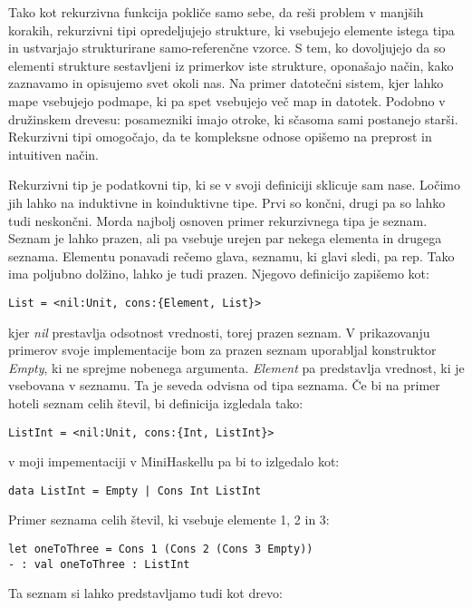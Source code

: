 \documentclass[12pt,a4paper,openany]{book}
\begin{document}
Tako kot rekurzivna funkcija pokliče samo sebe, da reši problem v manjših korakih, rekurzivni tipi opredeljujejo strukture, ki vsebujejo elemente istega tipa in ustvarjajo strukturirane 
samo-referenčne vzorce. S tem, ko dovoljujejo da so elementi strukture sestavljeni iz primerkov iste strukture, oponašajo način, kako zaznavamo in opisujemo svet okoli nas. 
Na primer datotečni sistem, kjer lahko mape vsebujejo podmape, ki pa spet vsebujejo več map in datotek. Podobno v družinskem drevesu: posamezniki imajo otroke, ki sčasoma sami 
postanejo starši. Rekurzivni tipi omogočajo, da te kompleksne odnose opišemo na preprost in intuitiven način.

Rekurzivni tip je podatkovni tip, ki se v svoji definiciji sklicuje sam nase. Ločimo jih lahko na induktivne in koinduktivne tipe. Prvi so končni, drugi pa so lahko tudi neskončni. 
Morda najbolj osnoven primer rekurzivnega tipa je seznam. Seznam je lahko prazen, ali pa vsebuje urejen par nekega elementa in drugega seznama. Elementu ponavadi rečemo glava, seznamu, 
ki glavi sledi, pa rep. Tako ima poljubno dolžino, lahko je tudi prazen. Njegovo definicijo zapišemo kot:
\begin{lstlisting}
List = <nil:Unit, cons:{Element, List}>
\end{lstlisting}
kjer \emph{nil} prestavlja odsotnost vrednosti, torej prazen seznam. V prikazovanju primerov svoje implementacije bom za prazen seznam uporabljal konstruktor \emph{Empty}, 
ki ne sprejme nobenega argumenta. \emph{Element} pa predstavlja vrednost, ki je vsebovana v seznamu. Ta je seveda odvisna od tipa seznama. Če bi na primer hoteli seznam celih števil, 
bi definicija izgledala tako:
\begin{lstlisting}
ListInt = <nil:Unit, cons:{Int, ListInt}>
\end{lstlisting}
v moji impementaciji v MiniHaskellu pa bi to izlgedalo kot:
\begin{lstlisting}
data ListInt = Empty | Cons Int ListInt
\end{lstlisting}
Primer seznama celih števil, ki vsebuje elemente 1, 2 in 3:
\begin{lstlisting}
let oneToThree = Cons 1 (Cons 2 (Cons 3 Empty))
- : val oneToThree : ListInt
\end{lstlisting}

Ta seznam si lahko predstavljamo tudi kot drevo:

\begin{center}
\end{center}
\end{document}
